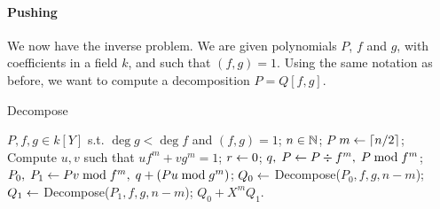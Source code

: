 \documentclass{sig-alternate}
\begin{document}
\paragraph{Pushing}
We now have the inverse problem. We are given polynomials $P$, $f$ and
$g$, with coefficients in a field $k$, and such that $(f,g)=1$. Using
the same notation as before, we want to compute a decomposition
$P=Q[f,g]$.

\begin{algorithm}[t]
  \caption{Decompose}
  \label{alg:decompose}
  \begin{algorithmic}[1]
    \REQUIRE $P,f,g\in k[Y]$ s.t. $\deg g<\deg f$ and $(f,g)=1$;
    \REQUIRE $n\in\mathbb{N}$;
    \ENSURE $P$
    \ELSE
    \STATE $m \leftarrow \lceil n/2 \rceil$;
    \STATE \label{alg:decompose:xgcd}
    Compute $u, v$ such that $uf^m + vg^m = 1$;
    \STATE $r \leftarrow 0$;
    \STATE \label{alg:decompose:div}
    $q,\; P \leftarrow P \div f^m,\; P \bmod f^m$;
    \ENDIF
    \STATE \label{alg:decompose:split}
    $P_0,\; P_1 \leftarrow Pv \bmod f^m,\; q + (Pu \bmod g^m)$;
    \STATE $Q_0 \leftarrow$ Decompose($P_0, f, g, n-m$);
    \STATE $Q_1 \leftarrow$ Decompose($P_1, f, g, n-m$);
    \ENSURE $Q_0 + X^mQ_1$.
    \ENDIF
  \end{algorithmic}
\end{algorithm}
\end{document}
